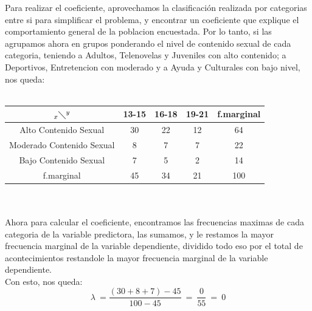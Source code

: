 \documentclass[letterpaper,spanish,11pt]{article}
\begin{document}
\begin{itemize}
\begin{enumerate}
	Para realizar el coeficiente, aprovechamos la clasificaci\'on realizada por categorias entre si para simplificar el problema, y encontrar un coeficiente que explique el comportamiento general de la poblacion encuestada. Por lo tanto, si las agrupamos ahora en grupos ponderando el nivel de contenido sexual de cada categoria, teniendo a Adultos, Telenovelas y Juveniles con alto contenido; a Deportivos, Entretencion con moderado y a Ayuda y Culturales con bajo nivel, nos queda:\\\\

        \begin{tabular}[c]{|c|c c c|c|}
        \hline
        $_x\diagdown ^{y}$ & 13-15 & 16-18 & 19-21 & f.marginal \\
        \hline
        Alto Contenido Sexual & 30 & 22 & 12 & 64 \\
        Moderado Contenido Sexual & 8 & 7 & 7 & 22 \\
        Bajo Contenido Sexual & 7 & 5 & 2 & 14 \\
	\hline
        f.marginal & 45 & 34 & 21 & 100 \\
        \hline
        \end{tabular}
\\\\
	Ahora para calcular el coeficiente, encontramos las frecuencias maximas de cada categoria de la variable predictora, las sumamos, y le restamos la mayor frecuencia marginal de la variable dependiente, dividido todo eso por el total de acontecimientos restandole la mayor frecuencia marginal de la variable dependiente.\\

	Con esto, nos queda:\\
	$$\lambda\ = \dfrac{(30+8+7)-45}{100-45}\ =\ \dfrac{0}{55}\ =\ 0$$\\
	
	

%
%	
%
%


\end{enumerate}
\end{itemize}
\end{document}
